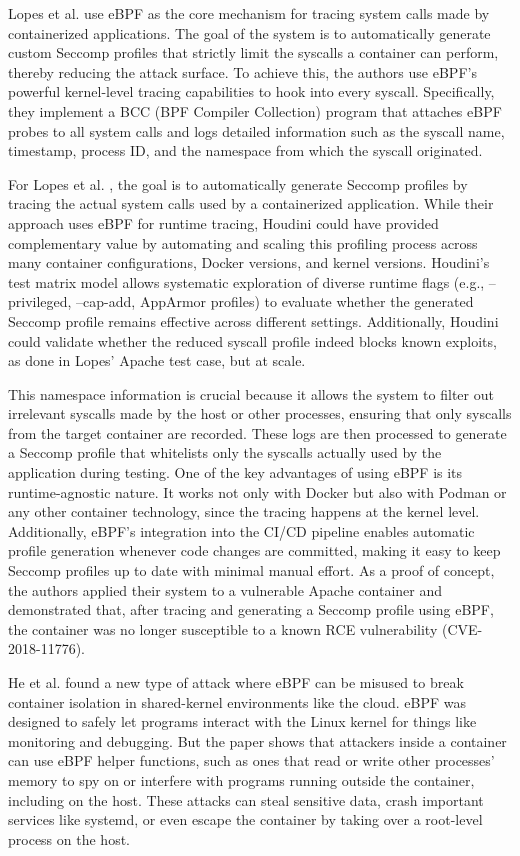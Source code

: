 \documentclass[12pt]{report}
\begin{document}
\begin{doublespace}
Lopes et al. \cite{lopes2020container} use eBPF as the core mechanism for tracing system calls made by containerized applications. The goal of the system is to automatically generate custom Seccomp profiles that strictly limit the syscalls a container can perform, thereby reducing the attack surface. To achieve this, the authors use eBPF's powerful kernel-level tracing capabilities to hook into every syscall. Specifically, they implement a BCC (BPF Compiler Collection) program that attaches eBPF probes to all system calls and logs detailed information such as the syscall name, timestamp, process ID, and the namespace from which the syscall originated.

For Lopes et al. \cite{lopes2020container}, the goal is to automatically generate Seccomp profiles by tracing the actual system calls used by a containerized application. While their approach uses eBPF for runtime tracing, Houdini could have provided complementary value by automating and scaling this profiling process across many container configurations, Docker versions, and kernel versions. Houdini’s test matrix model allows systematic exploration of diverse runtime flags (e.g., --privileged, --cap-add, AppArmor profiles) to evaluate whether the generated Seccomp profile remains effective across different settings. Additionally, Houdini could validate whether the reduced syscall profile indeed blocks known exploits, as done in Lopes' Apache test case, but at scale.

This namespace information is crucial because it allows the system to filter out irrelevant syscalls made by the host or other processes, ensuring that only syscalls from the target container are recorded. These logs are then processed to generate a Seccomp profile that whitelists only the syscalls actually used by the application during testing. One of the key advantages of using eBPF is its runtime-agnostic nature. It works not only with Docker but also with Podman or any other container technology, since the tracing happens at the kernel level. Additionally, eBPF's integration into the CI/CD pipeline enables automatic profile generation whenever code changes are committed, making it easy to keep Seccomp profiles up to date with minimal manual effort. As a proof of concept, the authors applied their system to a vulnerable Apache container and demonstrated that, after tracing and generating a Seccomp profile using eBPF, the container was no longer susceptible to a known RCE vulnerability (CVE-2018-11776).

He et al. \cite{he2023cross} found a new type of attack where eBPF can be misused to break container isolation in shared-kernel environments like the cloud. eBPF was designed to safely let programs interact with the Linux kernel for things like monitoring and debugging. But the paper shows that attackers inside a container can use eBPF helper functions, such as ones that read or write other processes’ memory to spy on or interfere with programs running outside the container, including on the host. These attacks can steal sensitive data, crash important services like systemd, or even escape the container by taking over a root-level process on the host.


\end{doublespace}
\end{document}
